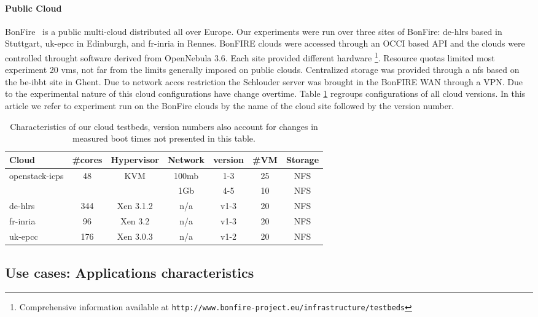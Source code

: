\paragraph{Public Cloud}

BonFire~\cite{Kavoussanakis2013} is  a public  multi-cloud distributed  all over
Europe. Our experiments  were run over three sites of  BonFire: de-hlrs based in
Stuttgart, uk-epcc  in Edinburgh,  and fr-inria in  Rennes. BonFIRE  clouds were
accessed  through an  OCCI based  API and  the clouds  were controlled  throught
software derived from OpenNebula 3.6.  Each site provided different hardware%
\footnote{Comprehensive            information           available            at
  \texttt{http://www.bonfire-project.eu/infrastructure/testbeds}}.%
Resource quotas  limited most experiment  20 \acp{vm},  not far from  the limits
generally imposed on  public clouds. Centralized storage was  provided through a
\ac{nfs} based on  the be-ibbt site in Ghent.  Due  to network acces restriction
the Schlouder server was  brought in the BonFIRE WAN through a  VPN.  Due to the
experimental nature  of this  cloud configurations  have change  overtime. Table
\ref{tab:platforms}  regroups  configurations of  all  cloud  versions. In  this
article we  refer to experiment  run on  the BonFire clouds  by the name  of the
cloud site followed by the version number.

\begin{table}
	\begin{tabular}{|l|c|c|c|c|c|c|}
		\hline
		Cloud&\#cores&Hypervisor&Network&version&\#VM&Storage\\ \hline
		\multirow{2}{*}{openstack-icps}&\multirow{2}{*}{48}&
                \multirow{2}{*}{KVM}&100mb&1-3&25&NFS\\\cline{4-7}
		&&&1Gb&4-5&10&NFS\\\hline
		de-hlrs&344&Xen 3.1.2&n/a&v1-3&20&NFS\\\hline
		fr-inria&96&Xen 3.2&n/a&v1-3&20&NFS\\\hline
		uk-epcc&176&Xen 3.0.3&n/a&v1-2&20&NFS\\\hline

	\end{tabular}
	\caption{Characteristics of our cloud testbeds, version numbers also
	account for changes in measured boot times not presented in this table.}
	\label{tab:platforms}
\end{table}


\subsection{Use cases: Applications characteristics}
\label{sc:app}

